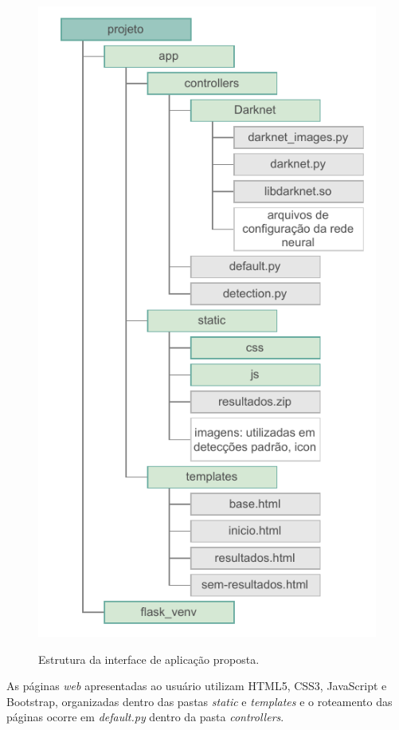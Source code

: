 \begin{figure}[!h] %
  \centering
  \caption{Estrutura da interface de aplicação proposta.}
  \includegraphics[scale=1.05]{img/img-resultados-api-estrutura.pdf}
  \label{fig:resultados-api-estrutura}
\end{figure}

As páginas \textit{web} apresentadas ao usuário utilizam HTML5, CSS3, JavaScript e Bootstrap, organizadas dentro das pastas \textit{static} e \textit{templates} e o roteamento das páginas ocorre em \textit{default.py} dentro da pasta \textit{controllers}.


